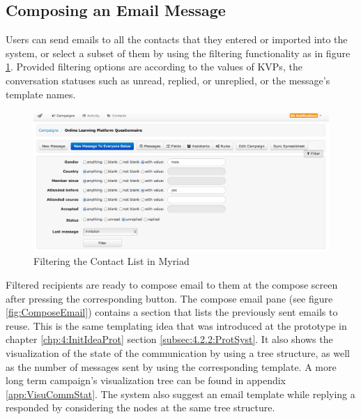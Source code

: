 \clearpage

\subsection{Composing an Email Message}
\label{subsec:5.2.4:CompEmaiMess}

Users can send emails to all the contacts that they entered or imported into the system, or select a subset of them by using the filtering functionality as in figure \ref{fig:ContactFilters}. Provided filtering options are according to the values of \ac{KVP}s, the conversation statuses such as unread, replied, or unreplied, or the message's template names.

\begin{figure}[htbp]
	\centering
	\includegraphics[width=1.00\textwidth]{imgs/ContactFilters.png}
	\caption[Filtering the Contact List in Myriad]{Filtering the Contact List in Myriad}
	\label{fig:ContactFilters}
\end{figure}

Filtered recipients are ready to compose email to them at the compose screen after pressing the corresponding button. The compose email pane (see figure \ref{fig:ComposeEmail}) contains a section that lists the previously sent emails to reuse. This is the same templating idea that was introduced at the prototype in chapter \ref{chp:4:InitIdeaProt} section \ref{subsec:4.2.2:ProtSyst}. It also shows the visualization of the state of the communication by using a tree structure, as well as the number of messages sent by using the corresponding template. A more long term campaign's visualization tree can be found in appendix \ref{app:VisuCommStat}. The system also suggest an email template while replying a responded by considering the nodes at the same tree structure.

